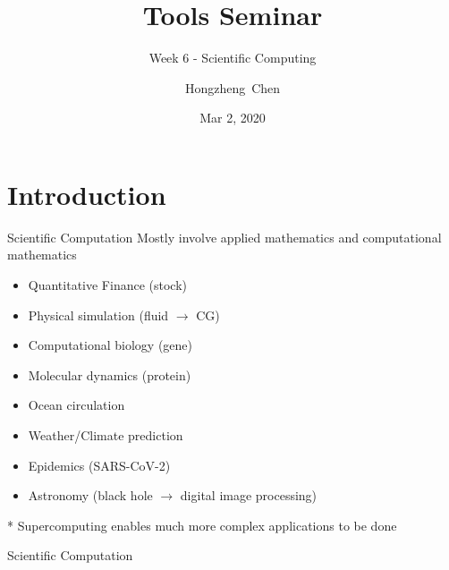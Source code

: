 \documentclass{../TexTemplate/myslide}
\title[ToolsSeminar]{Tools Seminar}
\subtitle{Week 6 - Scientific Computing}
\author[chhzh123]{Hongzheng~Chen}
\date[Mar 2, 2020]{Mar 2, 2020}
\begin{document}
\begin{frame}
\titlepage
\end{frame}

\begin{frame}
\tableofcontents
\end{frame}

\section{Introduction}
\begin{frame}
\sectionpage
\end{frame}

\begin{frame}{Scientific Computation}
Mostly involve applied mathematics and computational mathematics
\begin{itemize}
	\item Quantitative Finance (stock)
	\item Physical simulation (fluid $\to$ CG)
	\item Computational biology (gene)
	\item Molecular dynamics (protein)
	\item Ocean circulation
	\item Weather/Climate prediction
	\item Epidemics (SARS-CoV-2)
	\item Astronomy (black hole $\to$ digital image processing)
\end{itemize}
* Supercomputing enables much more complex applications to be done
\end{frame}

\begin{frame}{Scientific Computation}
\end{frame}
\end{document}
